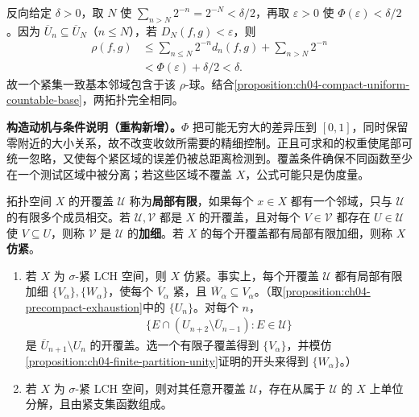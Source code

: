 \documentclass[../../main.tex]{subfiles}%
\begin{document}
\begin{solution}
\begin{enumerate}
反向给定 $\delta>0$，取 $N$ 使 $\sum_{n>N}2^{-n}=2^{-N}<\delta/2$，再取 $\varepsilon>0$ 使 $\Phi(\varepsilon)<\delta/2$。因为 $\overline U_n\subseteq\overline U_N$（$n\le N$），若 $D_N(f,g)<\varepsilon$，则
\begin{align*}
\rho(f,g)&\le\sum_{n\le N}2^{-n}d_n(f,g)+\sum_{n>N}2^{-n}\\
&<\Phi(\varepsilon)+\delta/2<\delta.
\end{align*}
故一个紧集一致基本邻域包含于该 $\rho$-球。结合\cref{proposition:ch04-compact-uniform-countable-base}，两拓扑完全相同。
\end{enumerate}
\end{solution}
\begin{remark}
\textbf{构造动机与条件说明（重构新增）。}$\Phi$ 把可能无穷大的差异压到 $[0,1]$，同时保留零附近的大小关系，故不改变收敛所需要的精细控制。正且可求和的权重使尾部可统一忽略，又使每个紧区域的误差仍被总距离检测到。覆盖条件确保不同函数至少在一个测试区域中被分离；若这些区域不覆盖 $X$，公式可能只是伪度量。
\end{remark}
\begin{exercise}\label{exercise:ch04-paracompact-partitions}
\begin{definition*}\label{definition:ch04-paracompact}
拓扑空间 $X$ 的开覆盖 $\mathcal U$ 称为\textbf{局部有限}，如果每个 $x\in X$ 都有一个邻域，只与 $\mathcal U$ 的有限多个成员相交。若 $\mathcal U,\mathcal V$ 都是 $X$ 的开覆盖，且对每个 $V\in\mathcal V$ 都存在 $U\in\mathcal U$ 使 $V\subseteq U$，则称 $\mathcal V$ 是 $\mathcal U$ 的\textbf{加细}。若 $X$ 的每个开覆盖都有局部有限加细，则称 $X$ \textbf{仿紧}。
\end{definition*}
\begin{enumerate}
\item\label{item:ch04-paracompact-refinement} 若 $X$ 为 $\sigma$-紧 LCH 空间，则 $X$ 仿紧。事实上，每个开覆盖 $\mathcal U$ 都有局部有限加细 $\{V_\alpha\},\{W_\alpha\}$，使每个 $\overline V_\alpha$ 紧，且 $\overline W_\alpha\subseteq V_\alpha$。（取\cref{proposition:ch04-precompact-exhaustion}中的 $\{U_n\}$。对每个 $n$，
\begin{align*}
\{E\cap(U_{n+2}\setminus\overline U_{n-1}):E\in\mathcal U\}
\end{align*}
是 $\overline U_{n+1}\setminus U_n$ 的开覆盖。选一个有限子覆盖得到 $\{V_\alpha\}$，并模仿\cref{proposition:ch04-finite-partition-unity}证明的开头来得到 $\{W_\alpha\}$。）
\item\label{item:ch04-paracompact-unity} 若 $X$ 为 $\sigma$-紧 LCH 空间，则对其任意开覆盖 $\mathcal U$，存在从属于 $\mathcal U$ 的 $X$ 上单位分解，且由紧支集函数组成。
\end{enumerate}
\end{exercise}
\end{document}
